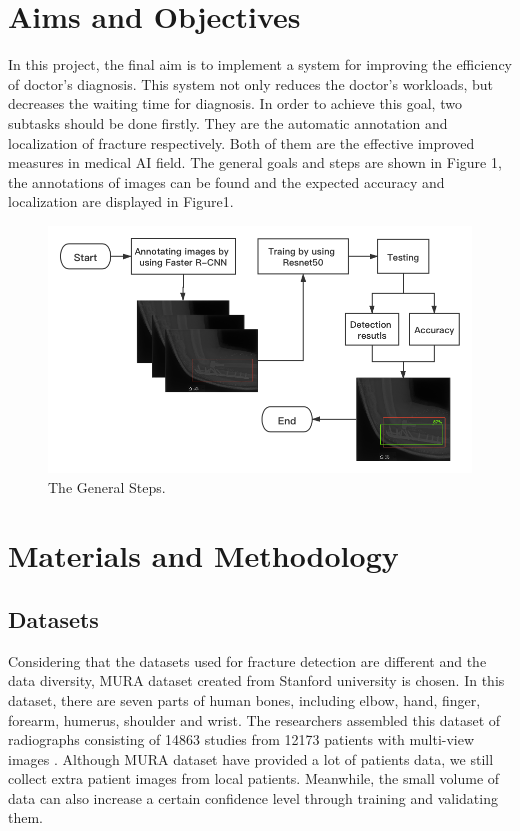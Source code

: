 \documentclass[12pt,oneside,a4paper]{article}
\begin{document}
\clearpage
\section{Aims and Objectives}
In this project, the final aim is to implement a system for improving the efficiency of doctor’s diagnosis. This system not only reduces the doctor’s workloads, but decreases the waiting time for diagnosis. In order to achieve this goal, two subtasks should be done firstly. They are the automatic annotation and localization of fracture respectively. Both of them are the effective improved measures in medical AI field. The general goals and steps are shown in Figure 1, the annotations of images can be found and the expected accuracy and localization are displayed in Figure1.
\begin{figure}
\begin{center}
\includegraphics[width=1\columnwidth]{images/TestingRes.png}
\caption{The General Steps.}
\end{center}
\end{figure}

\clearpage
\section{Materials and Methodology}
\subsection{Datasets}
Considering that the datasets used for fracture detection are different and the data diversity, MURA dataset created from Stanford university is chosen. In this dataset, there are seven parts of human bones, including elbow, hand, finger, forearm, humerus, shoulder and wrist. The researchers assembled this dataset of radiographs consisting of 14863 studies from 12173 patients with multi-view images \cite{b3}. Although MURA dataset have provided a lot of patients data, we still collect extra patient images from local patients. Meanwhile, the small volume of data can also increase a certain confidence level through training and validating them.
\end{document}
